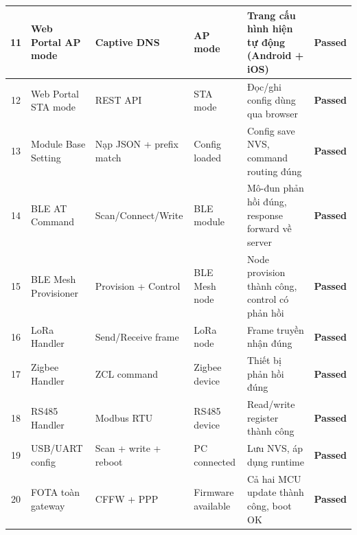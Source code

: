 \begin{longtable}{|c|p{2.5cm}|p{3.5cm}|p{2cm}|p{4cm}|c|}
            11 & Web Portal AP mode & Captive DNS & AP mode & Trang cấu hình hiện tự động (Android + iOS) & \textcolor{modern_blue}{\textbf{Passed}} \\ \hline
            12 & Web Portal STA mode & REST API & STA mode & Đọc/ghi config dùng qua browser & \textcolor{modern_blue}{\textbf{Passed}} \\ \hline
            13 & Module Base Setting & Nạp JSON + prefix match & Config loaded & Config save NVS, command routing đúng & \textcolor{modern_blue}{\textbf{Passed}} \\ \hline
            14 & BLE AT Command & Scan/Connect\newline/Write & BLE module & Mô-đun phản hồi đúng, response forward về server & \textcolor{modern_blue}{\textbf{Passed}} \\ \hline
            15 & BLE Mesh Provisioner & Provision + Control & BLE Mesh node & Node provision thành công, control có phản hồi & \textcolor{modern_blue}{\textbf{Passed}} \\ \hline
            16 & LoRa Handler & Send/Receive frame & LoRa node & Frame truyền nhận đúng & \textcolor{modern_blue}{\textbf{Passed}} \\ \hline
            17 & Zigbee Handler & ZCL command & Zigbee device & Thiết bị phản hồi đúng & \textcolor{modern_blue}{\textbf{Passed}} \\ \hline
            18 & RS485 Handler & Modbus RTU & RS485 device & Read/write register thành công & \textcolor{modern_blue}{\textbf{Passed}} \\ \hline
            19 & USB/UART config & Scan + write + reboot & PC connected & Lưu NVS, áp dụng runtime & \textcolor{modern_blue}{\textbf{Passed}} \\ \hline
            20 & FOTA toàn gateway & CFFW + PPP & Firmware available & Cả hai MCU update thành công, boot OK & \textcolor{modern_blue}{\textbf{Passed}} \\ \hline
        \end{longtable}
        
